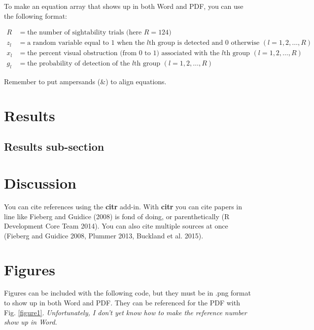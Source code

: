 \documentclass[]{article}
\begin{document}
To make an equation array that shows up in both Word and PDF, you can
use the following format:

\[
\begin{aligned}
R  &=  \text{the number of sightability trials (here }R = 124)\\
z_l &= \text{a random variable equal to 1 when the }l\text{th group is detected and 0 otherwise } (l = 1,2, \ldots, R)\\
x_l &= \text{the percent visual obstruction (from 0 to 1) associated with the }l\text{th group } (l = 1,2, \ldots, R)\\
g_l &= \text{the probability of detection of the }l\text{th group } (l = 1,2, \ldots, R)
\end{aligned}
\]

Remember to put ampersands (\&) to align equations.

\section{Results}\label{results}

\subsection{Results sub-section}\label{results-sub-section}

\section{Discussion}\label{discussion}

You can cite references using the \textbf{citr} add-in. With
\textbf{citr} you can cite papers in line like Fieberg and Guidice
(2008) is fond of doing, or parenthetically (R Development Core Team
2014). You can also cite multiple sources at once (Fieberg and Guidice
2008, Plummer 2013, Buckland et al. 2015).

\section{Figures}\label{figures}

Figures can be included with the following code, but they must be in
.png format to show up in both Word and PDF. They can be referenced for
the PDF with Fig. \ref{figure1}. \emph{Unfortunately, I don't yet know
how to make the reference number show up in Word.}
\end{document}
